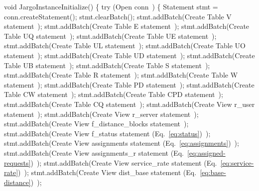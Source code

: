 void JargoInstanceInitialize() \{
  try (\LA{}Open \code{}conn\edoc{}~{\nwtagstyle{}}\RA{}) \{
    Statement stmt = conn.createStatement();
    stmt.clearBatch();
    stmt.addBatch(\LA{}Create Table V statement~{\nwtagstyle{}}\RA{});
    stmt.addBatch(\LA{}Create Table E statement~{\nwtagstyle{}}\RA{});
    stmt.addBatch(\LA{}Create Table UQ statement~{\nwtagstyle{}}\RA{});
    stmt.addBatch(\LA{}Create Table UE statement~{\nwtagstyle{}}\RA{});
    stmt.addBatch(\LA{}Create Table UL statement~{\nwtagstyle{}}\RA{});
    stmt.addBatch(\LA{}Create Table UO statement~{\nwtagstyle{}}\RA{});
    stmt.addBatch(\LA{}Create Table UD statement~{\nwtagstyle{}}\RA{});
    stmt.addBatch(\LA{}Create Table UB statement~{\nwtagstyle{}}\RA{});
    stmt.addBatch(\LA{}Create Table S statement~{\nwtagstyle{}}\RA{});
    stmt.addBatch(\LA{}Create Table R statement~{\nwtagstyle{}}\RA{});
    stmt.addBatch(\LA{}Create Table W statement~{\nwtagstyle{}}\RA{});
    stmt.addBatch(\LA{}Create Table PD statement~{\nwtagstyle{}}\RA{});
    stmt.addBatch(\LA{}Create Table CW statement~{\nwtagstyle{}}\RA{});
    stmt.addBatch(\LA{}Create Table CPD statement~{\nwtagstyle{}}\RA{});
    stmt.addBatch(\LA{}Create Table CQ statement~{\nwtagstyle{}}\RA{});
    stmt.addBatch(\LA{}Create View r\_user statement~{\nwtagstyle{}}\RA{});
    stmt.addBatch(\LA{}Create View r\_server statement~{\nwtagstyle{}}\RA{});
    stmt.addBatch(\LA{}Create View f\_distance\_blocks statement~{\nwtagstyle{}}\RA{});
    stmt.addBatch(\LA{}Create View f\_status statement (Eq.~\ref{eq:status})~{\nwtagstyle{}}\RA{});
    stmt.addBatch(\LA{}Create View assignments statement (Eq.~\ref{eq:assignments})~{\nwtagstyle{}}\RA{});
    stmt.addBatch(\LA{}Create View assignments\_r statement (Eq.~\ref{eq:assigned-requests})~{\nwtagstyle{}}\RA{});
    stmt.addBatch(\LA{}Create View service\_rate statement (Eq.~\ref{eq:service-rate})~{\nwtagstyle{}}\RA{});
    stmt.addBatch(\LA{}Create View dist\_base statement (Eq.~\ref{eq:base-distance})~{\nwtagstyle{}}\RA{});

